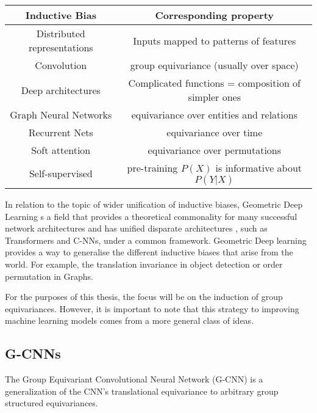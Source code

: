 \begin{table}
	\centering
	\begin{tabular}{|c | c|}
		\hline
		Inductive Bias              & Corresponding property                              \\
		\hline
		\hline
		Distributed representations & Inputs mapped to patterns of features               \\
		\hline
		Convolution                 & group equivariance (usually over space)             \\
		\hline
		Deep architectures          & Complicated functions = composition of simpler ones \\
		\hline
		Graph Neural Networks       & equivariance over entities and relations            \\
		\hline
		Recurrent Nets              & equivariance over time                              \\
		\hline
		Soft attention              & equivariance over permutations                      \\
		\hline
		Self-supervised             & pre-training $P(X)$ is informative about $P(Y |X)$  \\
		\hline
	\end{tabular}
\end{table}

In relation to the topic of wider unification of inductive biases, Geometric Deep Learning s a field that provides a theoretical commonality for many successful network architectures and has unified disparate architectures \cite{bronstein2021geometric}, such as Transformers and C-NNs, under a common framework. Geometric Deep learning provides a way to generalise the different inductive biases that arise from the world. For example, the translation invariance in object detection or order permutation in Graphs.

For the purposes of this thesis, the focus will be on the induction of group equivariances. However, it is important to note that this strategy to improving machine learning models comes from a more general class of ideas.


\subsection{G-CNNs}\label{sec:G-CNNs}

The Group Equivariant Convolutional Neural Network (G-CNN) is a generalization of the CNN's translational equivariance to arbitrary group structured equivariances.

